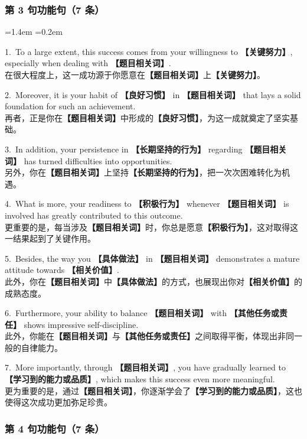 \documentclass[11pt,a4paper]{ctexart}
\newcommand{\fillin}[1]{{\bfseries【#1】}}
\newenvironment{eg}{%
  \par\addvspace{4pt}%
  \begin{list}{}{\leftmargin=1.4em \rightmargin=0.2em \listparindent=0pt
    \itemindent=0pt \topsep=0pt \parsep=2pt \itemsep=2pt \partopsep=0pt}%
  \item\relax
}{%
  \end{list}\addvspace{5pt}%
}
\begin{document}
\subsubsection{第 3 句功能句（7 条）}

\begin{eg}
1.\ To a large extent, this success comes from your willingness to \fillin{关键努力}, especially when dealing with \fillin{题目相关词}.\\
在很大程度上，这一成功源于你愿意在\fillin{题目相关词}上\fillin{关键努力}。

2.\ Moreover, it is your habit of \fillin{良好习惯} in \fillin{题目相关词} that lays a solid foundation for such an achievement.\\
再者，正是你在\fillin{题目相关词}中形成的\fillin{良好习惯}，为这一成就奠定了坚实基础。

3.\ In addition, your persistence in \fillin{长期坚持的行为} regarding \fillin{题目相关词} has turned difficulties into opportunities.\\
另外，你在\fillin{题目相关词}上坚持\fillin{长期坚持的行为}，把一次次困难转化为机遇。

4.\ What is more, your readiness to \fillin{积极行为} whenever \fillin{题目相关词} is involved has greatly contributed to this outcome.\\
更重要的是，每当涉及\fillin{题目相关词}时，你总是愿意\fillin{积极行为}，这对取得这一结果起到了关键作用。

5.\ Besides, the way you \fillin{具体做法} in \fillin{题目相关词} demonstrates a mature attitude towards \fillin{相关价值}.\\
此外，你在\fillin{题目相关词}中\fillin{具体做法}的方式，也展现出你对\fillin{相关价值}的成熟态度。

6.\ Furthermore, your ability to balance \fillin{题目相关词} with \fillin{其他任务或责任} shows impressive self-discipline.\\
此外，你能在\fillin{题目相关词}与\fillin{其他任务或责任}之间取得平衡，体现出非同一般的自律能力。

7.\ More importantly, through \fillin{题目相关词}, you have gradually learned to \fillin{学习到的能力或品质}, which makes this success even more meaningful.\\
更为重要的是，通过\fillin{题目相关词}，你逐渐学会了\fillin{学习到的能力或品质}，这也使得这次成功更加弥足珍贵。
\end{eg}

\subsubsection{第 4 句功能句（7 条）}
\end{document}
